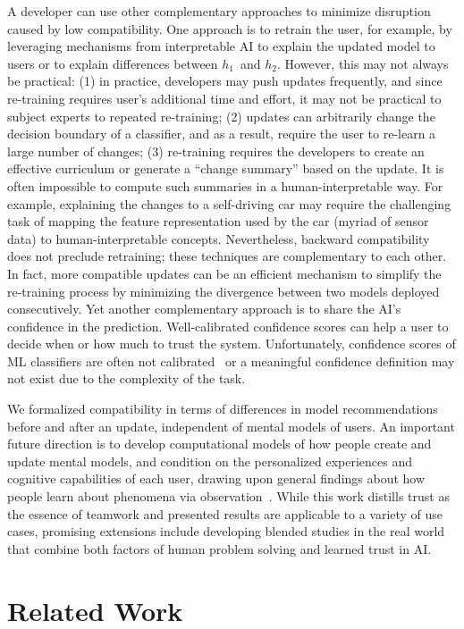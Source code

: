 \documentclass[letterpaper]{article}
\newcommand{\hone}{\mbox{$h_1$}}
\newcommand{\htwo}{\mbox{$h_2$}}
\begin{document}
A developer can use other complementary approaches to minimize disruption caused by low compatibility. One approach is to retrain the user, for example, by leveraging mechanisms from interpretable AI to explain the updated model to users or to explain differences between \hone\ and \htwo. However, this may not always be practical: 
(1) in practice, developers may push updates frequently, and since re-training requires user’s additional time and effort, it may not be practical to subject experts to repeated re-training; 
(2) updates can arbitrarily change the decision boundary of a classifier, and as a result, require the user to re-learn a large number of changes;
(3) re-training requires the developers to create an effective curriculum or generate a “change summary” based on the update. It is often impossible to compute such summaries in a human-interpretable way.
For example, explaining the changes to a self-driving car may require the challenging task of mapping the feature representation used by the car (myriad of sensor data) to human-interpretable concepts.
Nevertheless, backward compatibility does not preclude retraining; these techniques are complementary to each other. In fact, more compatible updates can be an efficient mechanism to simplify the re-training process by minimizing the divergence between two models deployed consecutively. Yet another complementary approach is to share the AI's confidence in the prediction. Well-calibrated confidence scores can help a user to decide when or how much to trust the system. Unfortunately, confidence scores of ML classifiers are often not calibrated~\cite{nguyen2015deep} or a meaningful confidence definition may not exist due to the complexity of the task.

We formalized compatibility in terms of differences in model recommendations before and after an update, independent of mental models of users. An important future direction is to develop computational models of how people create and update mental models, and condition on the personalized experiences and cognitive capabilities of each user, drawing upon general findings about how people learn about phenomena via observation~\cite{reber1989implicit}. While this work distills trust as the essence of teamwork and presented results are applicable to a variety of use cases, promising extensions include developing blended studies in the real world that combine both factors of human problem solving and learned trust in AI. 


\section{Related Work}
\end{document}
